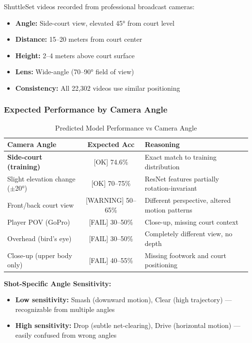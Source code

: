 \documentclass[11pt,a4paper]{article}
\begin{document}
ShuttleSet videos recorded from professional broadcast cameras:

\begin{itemize}
\item \textbf{Angle:} Side-court view, elevated 45° from court level
\item \textbf{Distance:} 15--20 meters from court center
\item \textbf{Height:} 2--4 meters above court surface
\item \textbf{Lens:} Wide-angle (70--90° field of view)
\item \textbf{Consistency:} All 22,302 videos use similar positioning
\end{itemize}

\subsubsection{Expected Performance by Camera Angle}

\begin{table}[H]
\centering
\caption{Predicted Model Performance vs Camera Angle}
\begin{tabular}{lcp{7cm}}
\toprule
Camera Angle & Expected Acc & Reasoning \\
\midrule
\textbf{Side-court (training)} & [OK] 74.6\% & Exact match to training distribution \\
Slight elevation change ($\pm$20°) & [OK] 70--75\% & ResNet features partially rotation-invariant \\
Front/back court view & [WARNING] 50--65\% & Different perspective, altered motion patterns \\
Player POV (GoPro) & [FAIL] 30--50\% & Close-up, missing court context \\
Overhead (bird's eye) & [FAIL] 30--50\% & Completely different view, no depth \\
Close-up (upper body only) & [FAIL] 40--55\% & Missing footwork and court positioning \\
\bottomrule
\end{tabular}
\end{table}

\textbf{Shot-Specific Angle Sensitivity:}

\begin{itemize}
\item \textbf{Low sensitivity:} Smash (downward motion), Clear (high trajectory) --- recognizable from multiple angles
\item \textbf{High sensitivity:} Drop (subtle net-clearing), Drive (horizontal motion) --- easily confused from wrong angles
\end{itemize}
\end{document}
